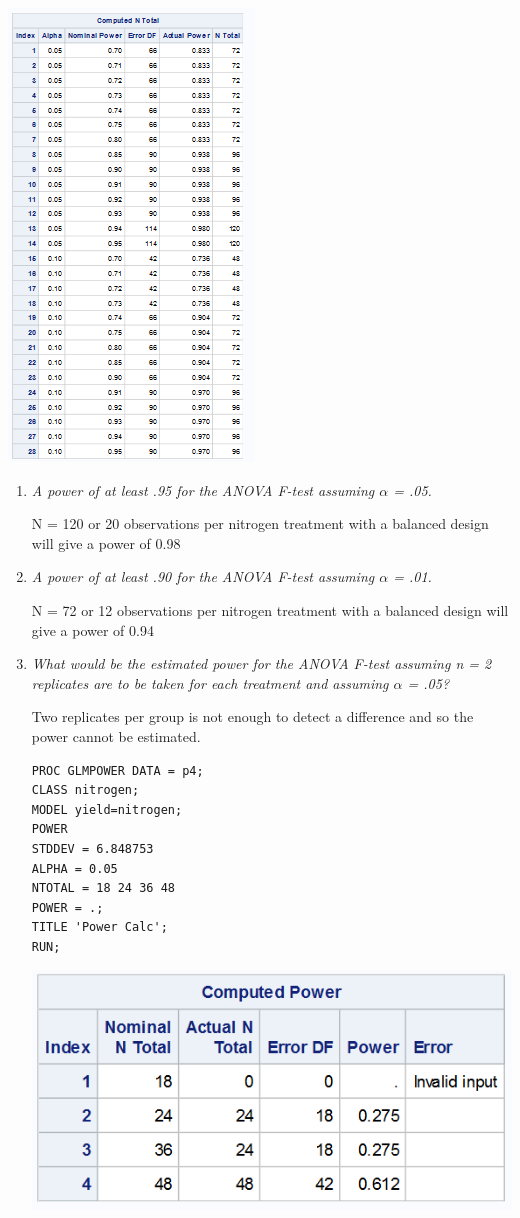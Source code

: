 \documentclass{article}\usepackage[]{graphicx}\usepackage[]{color}
\begin{document}
\begin{enumerate}
\includegraphics{power}

\begin{enumerate}
\item
{\it  A power of at least .95 for the ANOVA F-test assuming $\alpha$ = .05.}

N = 120 or 20 observations per nitrogen treatment with a balanced design will give a power of 0.98

\item 
{\it A power of at least .90 for the ANOVA F-test assuming $\alpha$ = .01.}

N = 72 or 12 observations per nitrogen treatment with a balanced design will give a power of 0.94

\item
{\it What would be the estimated power for the ANOVA F-test assuming n = 2 replicates are to be taken for each treatment and assuming $\alpha$ = .05?}

Two replicates per group is not enough to detect a difference and so the power cannot be estimated.

\begin{verbatim}
PROC GLMPOWER DATA = p4;
CLASS nitrogen;
MODEL yield=nitrogen;
POWER
STDDEV = 6.848753
ALPHA = 0.05
NTOTAL = 18 24 36 48
POWER = .;
TITLE 'Power Calc';
RUN;
\end{verbatim}

\includegraphics{power2}



\end{enumerate}
\end{enumerate}
\end{document}
